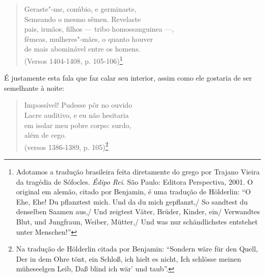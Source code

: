 \begin{verse}
Geraste"-me, conúbio, e germinaste,\\
Semeando o mesmo sêmen. Revelaste\\
pais, irmãos, filhos \qb{}--- tribo homossanguinea ---,\\
fêmeas, mulheres"-mães, o quanto houver\\
de mais abominável entre os homens.\\
(Versos 1404-1408, p. 105-106)\footnote{Adotamos a tradução
  brasileira feita diretamente do grego por Trajano Vieira da tragédia
  de Sófocles. \emph{Édipo Rei}. São Paulo: Editora Perspectiva, 2001. O
  original em alemão, citado por Benjamin, é uma tradução de Hölderlin:
  ``O Ehe, Ehe! Du pflanztest mich. Und da du mich gepflanzt,/
  So sandtest du denselben Saamen aus,/
  Und zeigtest Väter, Brüder, Kinder, ein/
  Verwandtes Blut, und Jungfraun, Weiber, Mütter,/
  Und was nur schändlichstes entstehet unter Menschen!'' \versal{[N. T.]}}
\end{verse}

É justamente esta fala que faz calar seu interior, assim como ele
gostaria de ser semelhante à noite:

\begin{verse}
Impossível! Pudesse pôr no ouvido\\
Lacre auditivo, e eu não hesitaria\\
em isolar meu pobre corpo: surdo,\\
além de cego.\\
(versos 1386-1389, p. 105)\footnote{Na tradução de Hölderlin
  citada por Benjamin: ``Sondern wäre für den Quell, Der in dem Ohre
  tönt, ein Schloß, ich hielt es nicht, Ich schlösse meinen müheseelgen
  Leib, Daß blind ich wär' und taub''. \versal{[N. T.]}}
\end{verse}

